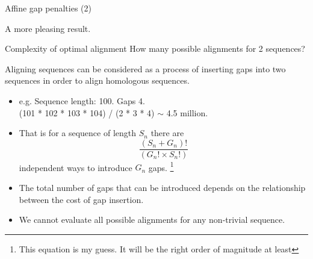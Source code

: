 \documentclass[pdf]{beamer}
\begin{document}
\begin{frame}[fragile]{Affine gap penalties (2)}
    \begin{figure}[ht]
    \end{figure}
    \pause
    A more pleasing result.
\end{frame}

\begin{frame}{Complexity of optimal alignment}
  How many possible alignments for 2 sequences?

  Aligning sequences can be considered as a process of inserting gaps into two
  sequences in order to align homologous sequences.
  \pause
  \begin{itemize}
    \item e.g. Sequence length: 100. Gaps 4.\\
      (101 * 102 * 103 * 104) / (2 * 3 * 4) $\sim$ 4.5 million.
      \pause
    \item That is for a sequence of length $S_n$ there are
      $$ \frac{(S_n + G_n)!}{(G_n! \times S_n!)} $$
      independent ways to introduce $G_n$ gaps.
      \footnote{This equation is my guess. It will be the right order of
        magnitude at least}
      \pause
    \item The total number of gaps that can be introduced depends
      on the relationship between the cost of gap insertion.
      \pause
    \item We cannot evaluate all possible alignments for any non-trivial sequence.
  \end{itemize}
    
\end{frame}
\end{document}
